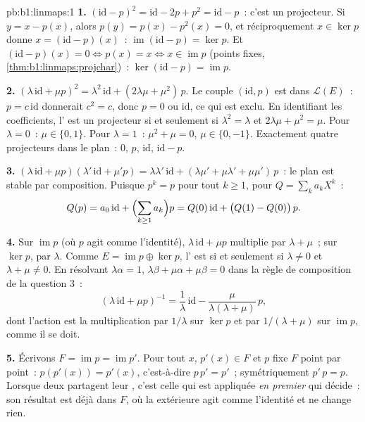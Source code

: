 \begin{solution}{pb:b1:linmaps:1}
\textbf{1.} $(\mathrm{id} - p)^2 = \mathrm{id} - 2p + p^2 =
\mathrm{id} - p$~: c'est un projecteur. Si $y = x - p(x)$, alors $p(y) =
p(x) - p^2(x) = 0$, et réciproquement $x \in \ker p$ donne $x =
(\mathrm{id} - p)(x)$~: $\operatorname{im}(\mathrm{id} - p) = \ker
p$. Et $(\mathrm{id} - p)(x) = 0 \iff p(x) = x \iff x \in
\operatorname{im} p$ (points fixes,
\cref{thm:b1:linmaps:projchar})~: $\ker(\mathrm{id} - p) =
\operatorname{im} p$.

\textbf{2.} $(\lambda\,\mathrm{id} + \mu p)^2 =
\lambda^2\,\mathrm{id} + (2\lambda\mu + \mu^2)\,p$. Le couple
$(\mathrm{id}, p)$ est  dans $\mathcal{L}(E)$~: $p = c\,
\mathrm{id}$ donnerait $c^2 = c$, donc $p = 0$ ou $\mathrm{id}$,
ce qui est exclu. En identifiant les coefficients, l' est un projecteur si et seulement si
$\lambda^2 = \lambda$ et $2\lambda\mu + \mu^2 = \mu$. Pour
$\lambda = 0$~: $\mu \in \{0, 1\}$. Pour $\lambda = 1$~: $\mu^2 +
\mu = 0$, $\mu \in \{0, -1\}$. Exactement quatre projecteurs dans le
plan~: $0$, $p$, $\mathrm{id}$, $\mathrm{id} - p$.

\textbf{3.} $(\lambda\,\mathrm{id} + \mu p)(\lambda'\,\mathrm{id}
+ \mu' p) = \lambda\lambda'\,\mathrm{id} + (\lambda\mu' +
\mu\lambda' + \mu\mu')\,p$~: le plan est stable par
composition. Puisque $p^k = p$ pour tout $k \geq 1$, pour $Q =
\sum_k a_k X^k$~:
\[
Q(p) = a_0\,\mathrm{id} + \Bigl(\sum_{k \geq 1} a_k\Bigr) p
= Q(0)\,\mathrm{id} + \bigl(Q(1) - Q(0)\bigr)\,p .
\]

\textbf{4.} Sur $\operatorname{im} p$ (où $p$ agit comme
l'identité), $\lambda\,\mathrm{id} + \mu p$ multiplie par $\lambda
+ \mu$~; sur $\ker p$, par $\lambda$. Comme $E = \operatorname{im} p
\oplus \ker p$, l' est  si et seulement si $\lambda \neq 0$ et
$\lambda + \mu \neq 0$. En résolvant $\lambda\alpha = 1$,
$\lambda\beta + \mu\alpha + \mu\beta = 0$ dans la règle de composition
de la question 3~:
\[
(\lambda\,\mathrm{id} + \mu p)^{-1}
= \frac1\lambda\,\mathrm{id} -
\frac{\mu}{\lambda(\lambda + \mu)}\,p ,
\]
dont l'action est la multiplication par $1/\lambda$ sur $\ker p$ et par $1/(\lambda +
\mu)$ sur $\operatorname{im} p$, comme il se doit.

\textbf{5.} Écrivons $F = \operatorname{im} p = \operatorname{im}
p'$. Pour tout $x$, $p'(x) \in F$ et $p$ fixe $F$ point par point~:
$p(p'(x)) = p'(x)$, c'est-à-dire $p\,p' = p'$~; symétriquement $p'\,p =
p$. Lorsque deux  partagent leur , c'est celle qui est appliquée
\emph{en premier} qui décide~: son résultat est déjà dans $F$, où la
 extérieure agit comme l'identité et ne change rien.


\end{solution}
